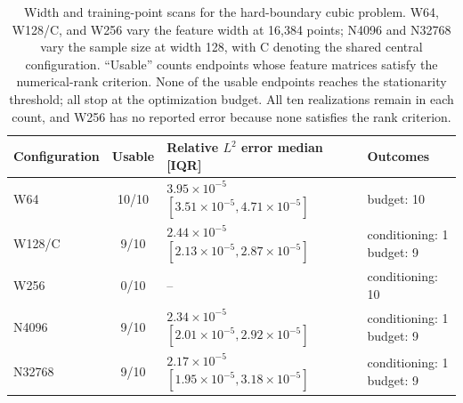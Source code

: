 \begin{table}[H]
\centering
\scriptsize
\setlength{\tabcolsep}{3pt}
\renewcommand{\arraystretch}{1.12}
\begin{tabular}{@{}lcll@{}}
\hline
Configuration & Usable & Relative $L^2$ error median [IQR] & Outcomes \\
\hline
W64 & 10/10 & \makecell[l]{$3.95\times10^{-5}$\\$[3.51\times10^{-5},4.71\times10^{-5}]$} & budget: 10 \\
W128/C & 9/10 & \makecell[l]{$2.44\times10^{-5}$\\$[2.13\times10^{-5},2.87\times10^{-5}]$} & \makecell[l]{conditioning: 1\\budget: 9} \\
W256 & 0/10 & -- & conditioning: 10 \\
N4096 & 9/10 & \makecell[l]{$2.34\times10^{-5}$\\$[2.01\times10^{-5},2.92\times10^{-5}]$} & \makecell[l]{conditioning: 1\\budget: 9} \\
N32768 & 9/10 & \makecell[l]{$2.17\times10^{-5}$\\$[1.95\times10^{-5},3.18\times10^{-5}]$} & \makecell[l]{conditioning: 1\\budget: 9} \\
\hline
\end{tabular}
\caption{Width and training-point scans for the hard-boundary cubic problem.  W64, W128/C, and W256 vary the feature width at 16,384 points; N4096 and N32768 vary the sample size at width 128, with C denoting the shared central configuration.  ``Usable'' counts endpoints whose feature matrices satisfy the numerical-rank criterion.  None of the usable endpoints reaches the stationarity threshold; all stop at the optimization budget.  All ten realizations remain in each count, and W256 has no reported error because none satisfies the rank criterion.}
\label{tab:application-scale}
\end{table}
